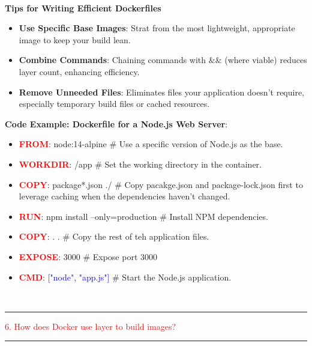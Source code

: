 \documentclass{article}
\begin{document}
\\
\textbf{Tips for Writing Efficient Dockerfiles}
\begin{itemize}
    \item \textbf{Use Specific Base Images}: Strat from the most lightweight, appropriate image to keep your build lean.
    \item \textbf{Combine Commands}: Chaining commands with $\&\&$ (where viable) reduces layer count, enhancing efficiency. 
    \item \textbf{Remove Unneeded Files}: Eliminates files your application doesn't require, especially temporary build files or cached resources.
\end{itemize}
\textbf{Code Example: Dockerfile for a Node.js Web Server}:
\begin{itemize}
    \item \textbf{\textcolor{Red}{FROM}}: \textcolor{PineGreen}{node:14-alpine} $\#$ Use a specific version of Node.js as the base.
    \item \textbf{\textcolor{Red}{WORKDIR}}: \textcolor{PineGreen}{/app} $\#$ Set the working directory in the container. 
    \item \textbf{\textcolor{Red}{COPY}}: \textcolor{PineGreen}{package*.json ./} $\#$ Copy pacakge.json and package-lock.json first to leverage caching when the dependencies haven't changed. 
    \item \textbf{\textcolor{Red}{RUN}}: \textcolor{PineGreen}{npm install --only=production} $\#$ Install NPM dependencies.
    \item \textbf{\textcolor{Red}{COPY}}: \textcolor{PineGreen}{ . .} $\#$ Copy the rest of teh application files.
    \item \textbf{\textcolor{Red}{EXPOSE}}: \textcolor{PineGreen}{3000} $\#$ Expose port 3000
    \item \textbf{\textcolor{Red}{CMD}}: \textcolor{Blue}{["node", "app.js"]} $\#$ Start the Node.js application.
\end{itemize}
\\
\noindent
{\color{red} \rule{\linewidth}{0.5mm}}
\textcolor{red}{6. How does Docker use layer to build images?} \\
\noindent
{\color{red} \rule{\linewidth}{0.5mm}}
\end{document}
